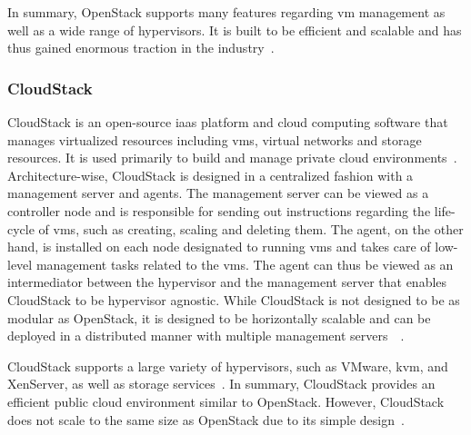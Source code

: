 \documentclass{kththesis}
\begin{document}
In summary, OpenStack supports many features regarding \Gls{vm} management as well as a wide range of hypervisors. It is built to be efficient and scalable and has thus gained enormous traction in the industry\ \cite{openstack-opennebula-comparison}.

\subsubsection*{CloudStack}
CloudStack is an open-source \Gls{iaas} platform and cloud computing software that manages virtualized resources including \Glspl{vm}, virtual networks and storage resources. It is used primarily to build and manage private cloud environments\ \cite{cs-overview}. Architecture-wise, CloudStack is designed in a centralized fashion with a management server and agents. The management server can be viewed as a controller node and is responsible for sending out instructions regarding the life-cycle of \Glspl{vm}, such as creating, scaling and deleting them. The agent, on the other hand, is installed on each node designated to running \Glspl{vm} and takes care of low-level management tasks related to the \Glspl{vm}. The agent can thus be viewed as an intermediator between the hypervisor and the management server that enables CloudStack to be hypervisor agnostic. While CloudStack is not designed to be as modular as OpenStack, it is designed to be horizontally scalable and can be deployed in a distributed manner with multiple management servers\ \cite{cs-overview}\ \cite{cs-live-migration}.

CloudStack supports a large variety of hypervisors, such as VMware, \Gls{kvm}, and XenServer, as well as storage services\ \cite{cs-overview}. In summary, CloudStack provides an efficient public cloud environment similar to OpenStack. However, CloudStack does not scale to the same size as OpenStack due to its simple design\ \cite{openstack-opennebula-comparison}.
\end{document}
